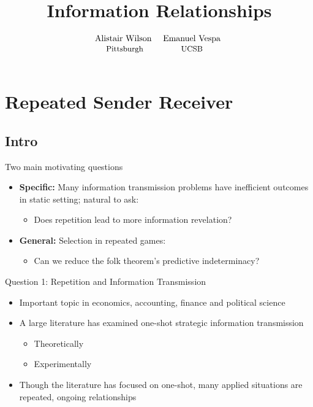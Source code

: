\documentclass{beamer}
\begin{document}
\section{Repeated Sender Receiver}
\title{Information Relationships}
\author{$\begin{array}{cc} \text{Alistair Wilson } & \text{Emanuel Vespa
}
\\ \text{\small Pittsburgh} & \text{\small UCSB }\end{array}$  }


\maketitle

\subsection{Intro}
\begin{frame}{Two main motivating questions}
    \begin{itemize}
        \item \textbf{Specific:} Many information transmission problems have inefficient
        outcomes in static setting; natural to ask: 
            \begin{itemize}
            \item Does repetition lead to more information revelation?\bigskip{}
            \end{itemize}
        \item \textbf{General:} Selection in repeated games:
            \begin{itemize}
            \item Can we reduce the folk theorem's predictive indeterminacy?
            \end{itemize}
    \end{itemize}
\end{frame}

\begin{frame}{Question 1: Repetition and Information Transmission}
    \begin{itemize}
    \item Important topic in economics, accounting, finance and political science
    \item A large literature has examined one-shot strategic information transmission
        \begin{itemize}
        \item Theoretically
        \item Experimentally
        \end{itemize}
    \item Though the literature has focused on one-shot, many applied situations
    are repeated, ongoing relationships
    \end{itemize}
\end{frame}
\end{document}
